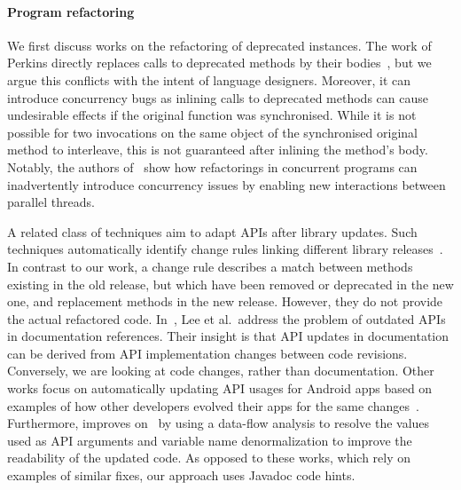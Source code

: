 \documentclass[sigconf]{acmart}
\begin{document}
\paragraph{Program refactoring}

We first discuss works on the refactoring of deprecated instances.  The work
of Perkins directly replaces calls to deprecated methods by their
bodies~\cite{DBLP:conf/paste/Perkins05}, but we argue this conflicts with the intent of language designers.
Moreover, it can introduce concurrency bugs as inlining calls to
deprecated methods can cause undesirable effects if the original function
was synchronised.  While it is not possible for two invocations on the same
object of the synchronised original method to interleave, this is not
guaranteed after inlining the method's body.  Notably, the authors of~\cite{10.1007/978-3-642-14107-2_11} show how refactorings in concurrent programs can inadvertently introduce concurrency issues by enabling new interactions between parallel threads.


A related class of techniques aim to adapt APIs after library updates.  Such
techniques automatically identify change rules linking different library
releases~\cite{DBLP:conf/icse/WuGAK10,DBLP:conf/kbse/Huang0PW021}.
In contrast to our work, a change rule describes a match between methods
existing in the old release, but which have been removed or deprecated in
the new one, and replacement methods in the new release.  However, they do
not provide the actual refactored code.
In~\cite{DBLP:journals/tse/LeeWCK21}, Lee et al.~address the problem of
outdated APIs in documentation references.  Their insight is that API
updates in documentation can be derived from API implementation changes
between code revisions.  Conversely, we are looking at code changes, rather
than documentation.  Other works focus on automatically updating API usages
for Android apps based on examples of how other developers evolved their
apps for the same
changes~\cite{DBLP:conf/issta/FazziniXO19,DBLP:conf/iwpc/HaryonoTKSML0J20}.
Furthermore, \cite{DBLP:journals/ese/HaryonoTLJLKSM22} improves
on~\cite{DBLP:conf/iwpc/HaryonoTKSML0J20} by using a data-flow analysis to
resolve the values used as API arguments and variable name denormalization
to improve the readability of the updated code.  As opposed to these works,
which rely on examples of similar fixes, our approach uses Javadoc code
hints.
\end{document}
